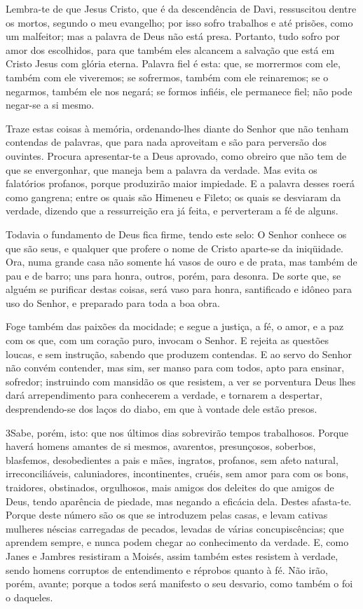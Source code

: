 Lembra-te de que Jesus Cristo, que é da descendência de Davi,
ressuscitou dentre os mortos, segundo o meu evangelho; por isso
sofro trabalhos e até prisões, como um malfeitor; mas a palavra de
Deus não está presa. Portanto, tudo sofro por amor dos
escolhidos, para que também eles alcancem a salvação que está em
Cristo Jesus com glória eterna. Palavra fiel é esta: que, se
morrermos com ele, também com ele viveremos; se sofrermos,
também com ele reinaremos; se o negarmos, também ele nos negará;
se formos infiéis, ele permanece fiel; não pode negar-se a si
mesmo.

Traze estas coisas à memória, ordenando-lhes diante do Senhor que
não tenham contendas de palavras, que para nada aproveitam e são
para perversão dos ouvintes. Procura apresentar-te a Deus
aprovado, como obreiro que não tem de que se envergonhar, que maneja
bem a palavra da verdade. Mas evita os falatórios profanos,
porque produzirão maior impiedade. E a palavra desses roerá
como gangrena; entre os quais são Himeneu e Fileto; os quais
se desviaram da verdade, dizendo que a ressurreição era já feita, e
perverteram a fé de alguns.

Todavia o fundamento de Deus fica firme, tendo este selo: O
Senhor conhece os que são seus, e qualquer que profere o nome de
Cristo aparte-se da iniqüidade. Ora, numa grande casa não
somente há vasos de ouro e de prata, mas também de pau e de barro;
uns para honra, outros, porém, para desonra. De sorte que, se
alguém se purificar destas coisas, será vaso para honra, santificado
e idôneo para uso do Senhor, e preparado para toda a boa obra.

Foge também das paixões da mocidade; e segue a justiça, a fé, o
amor, e a paz com os que, com um coração puro, invocam o Senhor.
E rejeita as questões loucas, e sem instrução, sabendo que
produzem contendas. E ao servo do Senhor não convém
contender, mas sim, ser manso para com todos, apto para ensinar,
sofredor; instruindo com mansidão os que resistem, a ver se
porventura Deus lhes dará arrependimento para conhecerem a verdade,
e tornarem a despertar, desprendendo-se dos laços do diabo,
em que à vontade dele estão presos.

\medskip

\lettrine{3} Sabe, porém, isto: que nos últimos dias
sobrevirão tempos trabalhosos. Porque haverá homens amantes de
si mesmos, avarentos, presunçosos, soberbos, blasfemos,
desobedientes a pais e mães, ingratos, profanos, sem afeto
natural, irreconciliáveis, caluniadores, incontinentes, cruéis, sem
amor para com os bons, traidores, obstinados, orgulhosos, mais
amigos dos deleites do que amigos de Deus, tendo aparência de
piedade, mas negando a eficácia dela. Destes afasta-te. Porque
deste número são os que se introduzem pelas casas, e levam cativas
mulheres néscias carregadas de pecados, levadas de várias
concupiscências; que aprendem sempre, e nunca podem chegar ao
conhecimento da verdade. E, como Janes e Jambres resistiram a
Moisés, assim também estes resistem à verdade, sendo homens
corruptos de entendimento e réprobos quanto à fé. Não irão,
porém, avante; porque a todos será manifesto o seu desvario, como
também o foi o daqueles.

